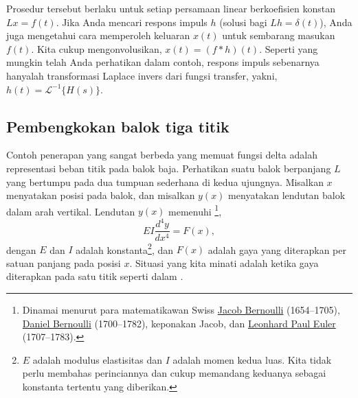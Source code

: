 Prosedur tersebut berlaku untuk setiap persamaan linear berkoefisien konstan
$Lx = f(t)$.
Jika Anda mencari respons impuls $h$
(solusi bagi $Lh = \delta(t)$),
Anda juga mengetahui cara memperoleh keluaran $x(t)$ untuk sembarang masukan $f(t)$.
Kita cukup mengonvolusikan, $x(t) = (f * h)(t)$.
Seperti yang mungkin telah Anda perhatikan dalam contoh,
respons impuls sebenarnya hanyalah transformasi Laplace invers
dari fungsi transfer, yakni,
$h(t) = {\mathcal{L}}^{-1} \bigl\{ H(s) \bigr\}$.

\subsection{Pembengkokan balok tiga titik}

Contoh penerapan yang sangat berbeda
yang memuat fungsi delta adalah representasi
beban titik pada balok baja.  Perhatikan suatu balok
berpanjang $L$ yang bertumpu pada dua tumpuan sederhana di kedua ujungnya.  Misalkan $x$ menyatakan
posisi pada balok, dan misalkan $y(x)$ menyatakan lendutan balok dalam
arah vertikal.  Lendutan $y(x)$ memenuhi
\emph{}%
\footnote{Dinamai menurut para matematikawan Swiss
\href{https://en.wikipedia.org/wiki/Jacob_Bernoulli}{Jacob Bernoulli}
(1654--1705),
\href{https://en.wikipedia.org/wiki/Daniel_Bernoulli}{Daniel Bernoulli}
(1700--1782), keponakan Jacob,
dan
\href{https://en.wikipedia.org/wiki/Euler}{Leonhard Paul Euler}
(1707--1783).},
\begin{equation*}
EI \frac{d^4 y}{dx^4} = F(x) ,
\end{equation*}
dengan $E$ dan $I$ adalah konstanta\footnote{$E$ adalah modulus elastisitas dan $I$
adalah momen kedua luas.  Kita tidak perlu membahas perinciannya dan cukup
memandang keduanya sebagai konstanta tertentu yang diberikan.}, dan
$F(x)$ adalah gaya yang diterapkan per satuan panjang pada posisi $x$.  Situasi
yang kita minati adalah ketika gaya diterapkan pada satu titik seperti dalam
.

\begin{myfig}
\capstart
{}
\caption{Pembengkokan tiga titik.\label{lt:beambendingfig}}
\end{myfig}

